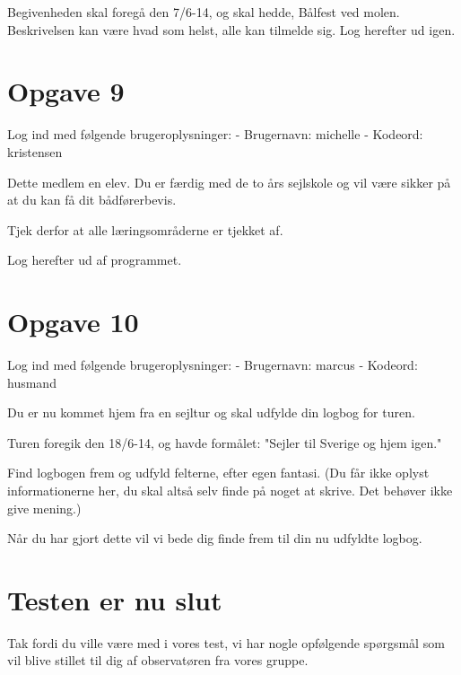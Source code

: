 Begivenheden skal foregå den 7/6-14, og skal hedde, Bålfest ved molen. Beskrivelsen kan være hvad som helst, alle kan tilmelde sig. Log herefter ud igen.


\section{Opgave 9}

Log ind med følgende brugeroplysninger: 
\newline - Brugernavn: michelle
\newline - Kodeord: kristensen

Dette medlem en elev. Du er færdig med de to års sejlskole og vil være sikker på at du kan få dit bådførerbevis.

Tjek derfor at alle læringsområderne er tjekket af.

Log herefter ud af programmet.


\section{Opgave 10}

Log ind med følgende brugeroplysninger: 
\newline - Brugernavn: marcus
\newline - Kodeord: husmand

Du er nu kommet hjem fra en sejltur og skal udfylde din logbog for turen.

Turen foregik den 18/6-14, og havde formålet: "Sejler til Sverige og hjem igen."

Find logbogen frem og udfyld felterne, efter egen fantasi. (Du får ikke oplyst informationerne her, du skal altså selv finde på noget at skrive. Det behøver ikke give mening.)

Når du har gjort dette vil vi bede dig finde frem til din nu udfyldte logbog. 

\section{Testen er nu slut}


Tak fordi du ville være med i vores test, vi har nogle opfølgende spørgsmål som vil blive stillet til dig af observatøren fra vores gruppe.


